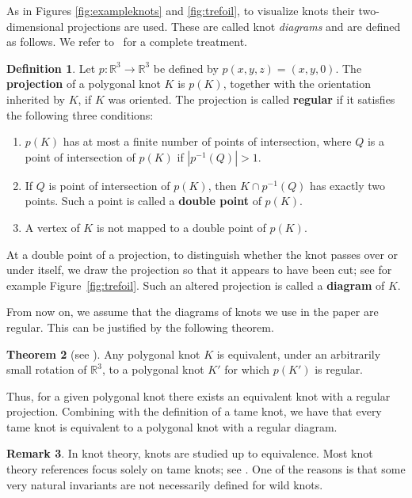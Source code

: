\documentclass[11pt,a4paper]{article}
\theoremstyle{definition}
\newtheorem{theorem}{Theorem}[section]
\newtheorem{definition}[theorem]{Definition}
\newtheorem{remark}[theorem]{Remark}
\newcommand{\numberset}{\mathbb}
\newcommand{\R}{\numberset{R}}
\begin{document}
As in Figures \ref{fig:exampleknots} and \ref{fig:trefoil}, to visualize knots their two-dimensional projections are used. These are called knot \textit{diagrams} and  are defined as follows. We refer to~\cite{murasugi1996knot} for a complete treatment.


\begin{definition}
\label{def:knotdiag}
Let $p:\R^3 \rightarrow \R^3$ be defined by $p(x,y,z) = (x,y,0)$. 
The 
\textbf{projection}
of a polygonal knot $K$ is 
$p(K)$, together with the orientation inherited by
$K$, if $K$ was oriented.
The projection is called \textbf{regular} if it satisfies the following three conditions:
\begin{enumerate}
    \item $p(K)$ has at most a finite number of points of intersection, where $Q$ is a point of intersection of $p(K)$ if $|p^{-1}(Q)| > 1.$ 
    \item If $Q$ is point of intersection of $p(K)$, then $K \cap p^{-1}(Q)$ has exactly two points. Such a point is called a \textbf{double point} of $p(K)$.
    \item A vertex of $K$ is not mapped to a double point of $p(K)$.
\end{enumerate}

At a double point of a projection, to distinguish whether the
knot passes over or under itself, we draw the projection
so that it appears to have been cut; see for example Figure~\ref{fig:trefoil}. Such an altered projection is called a \textbf{diagram} of $K$. 
\end{definition}





From now on, we assume that the diagrams of knots we use in the paper are regular. This can be justified by the following theorem.


\begin{theorem} [see \cite{crowell2012introduction}]
\label{thm:reg}
Any polygonal knot $K$ is equivalent, under an arbitrarily small rotation of $\R^3$, to a polygonal knot $K'$ for which $p(K')$ is regular.
\end{theorem}

Thus, for a given polygonal knot there exists an equivalent knot with a regular projection. Combining with the definition of a tame knot, we have that every tame knot is equivalent to a polygonal knot with a regular diagram.

\begin{remark}
\label{rem:explain}
In knot theory, knots are studied up to equivalence. Most knot theory references focus solely on tame knots; see \cite{crowell2012introduction}. One of the reasons is that some very natural invariants are not necessarily defined for wild knots.
\end{remark}
\end{document}
